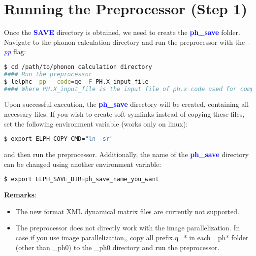 \documentclass[12pt,twoside,openany]{book}
\begin{document}
\section{Running the Preprocessor (Step 1)}
Once the \textcolor{blue}{\bf{SAVE}} directory is obtained, we need to create the \textcolor{blue}{\bf{ph\_save}} folder. Navigate to the phonon calculation directory and run the preprocessor with the \textcolor{blue}{\emph{-pp}} flag:
\begin{lstlisting}[language=bash]
$ cd /path/to/phonon calculation directory
#### Run the preprocessor
$ lelphc -pp --code=qe -F PH.X_input_file
#### Where PH.X_input_file is the input file of ph.x code used for computing phonons
\end{lstlisting}
Upon successful execution, the \textcolor{blue}{\bf{ph\_save}} directory will be created, containing all necessary files.
If you wish to create soft symlinks instead of copying these files, set the following environment variable (works only on linux):
\begin{lstlisting}[language=bash]
$ export ELPH_COPY_CMD="ln -sr"
\end{lstlisting}
and then run the preprocessor.
Additionally, the name of the \textcolor{blue}{\bf{ph\_save}} directory can be changed using another environment variable:
\begin{lstlisting}[language=bash]
$ export ELPH_SAVE_DIR=ph_save_name_you_want
\end{lstlisting}
\textbf{Remarks}:
\begin{itemize}
\item The new format XML dynamical matrix files are currently not supported.
\item The preprocessor does not directly work with the image parallelization. In case if you use image parallelization,, copy all prefix.q\_* in each \_ph* folder (other than \_ph0) to the \_ph0 directory 
and run the preprocessor.
\end{itemize}
\end{document}
